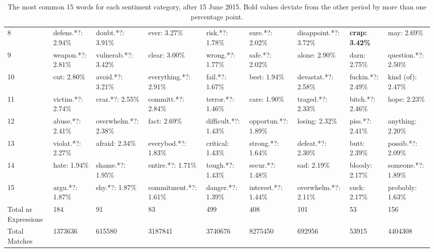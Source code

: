 \begin{table}[h]
\begin{adjustbox}{width=\linewidth, center}
\begin{tabular}{lllllllll}
	8                    &           defens.*?: 2.94\% &      doubt.*?: 3.91\% &           ever: 3.27\% &       risk.*?: 1.78\% &      sure.*?: 2.02\% &  disappoint.*?: 3.72\% &      \textbf{crap: 3.42\%} &           may: 2.69\% \\
	9                    &           weapon.*?: 2.81\% &   vulnerab.*?: 3.42\% &          clear: 3.00\% &      wrong.*?: 1.77\% &      safe.*?: 2.02\% &          alone: 2.90\% &               darn: 2.75\% &   question.*?: 2.50\% \\
	10                   &                 cut: 2.80\% &      avoid.*?: 3.21\% &  everything.*?: 2.91\% &       fail.*?: 1.67\% &         best: 1.94\% &    devastat.*?: 2.58\% &          fuckin.*?: 2.49\% &     kind (of): 2.47\% \\
	11                   &           victim.*?: 2.74\% &       craz.*?: 2.55\% &     committ.*?: 2.84\% &     terror.*?: 1.46\% &         care: 1.90\% &      traged.*?: 2.33\% &           bitch.*?: 2.46\% &          hope: 2.23\% \\
	12                   &            abuse.*?: 2.41\% &  overwhelm.*?: 2.38\% &           fact: 2.69\% &  difficult.*?: 1.43\% &  opportun.*?: 1.89\% &         losing: 2.32\% &            piss.*?: 2.41\% &      anything: 2.20\% \\
	13                   &           violat.*?: 2.27\% &        afraid: 2.34\% &    everybod.*?: 1.83\% &      critical: 1.43\% &    strong.*?: 1.64\% &      defeat.*?: 2.30\% &               butt: 2.39\% &     possib.*?: 2.09\% \\
	14                   &                hate: 1.94\% &      shame.*?: 1.95\% &      entire.*?: 1.71\% &      tough.*?: 1.43\% &     secur.*?: 1.48\% &            sad: 2.19\% &             bloody: 2.17\% &    someone.*?: 1.89\% \\
	15                   &             argu.*?: 1.87\% &        shy.*?: 1.87\% &  commitment.*?: 1.61\% &     danger.*?: 1.39\% &  interest.*?: 1.44\% &   overwhelm.*?: 2.11\% &               suck: 2.17\% &      probably: 1.63\% \\
	Total nr Expressions &                         184 &                    91 &                     83 &                   499 &                  408 &                    101 &                         53 &                   156 \\
	Total Matches        &                     1373636 &                615580 &                3187841 &               3740676 &              8275450 &                 692956 &                      53915 &               4404308 \\
	\bottomrule
	\end{tabular}
	
\end{adjustbox}
	\caption{The most common 15 words for each sentiment category, after 15 June 2015. Bold values deviate from the other period by more than one percentage point.}
	\label{fig: after_1}
\end{table}

